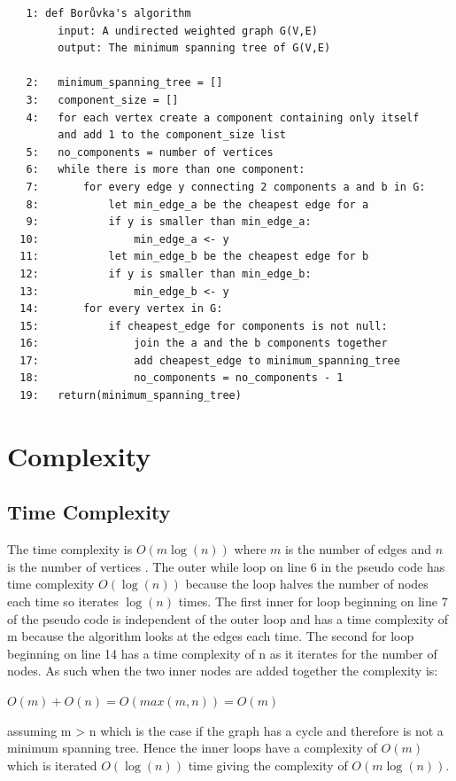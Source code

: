 \documentclass[a4paper,11pt]{article}
\begin{document}
\begin{verbatim}
   1: def Borůvka's algorithm
        input: A undirected weighted graph G(V,E)
        output: The minimum spanning tree of G(V,E)
    
   2:   minimum_spanning_tree = []
   3:   component_size = []
   4:   for each vertex create a component containing only itself 
        and add 1 to the component_size list
   5:   no_components = number of vertices
   6:   while there is more than one component:
   7:       for every edge y connecting 2 components a and b in G:
   8:           let min_edge_a be the cheapest edge for a 
   9:           if y is smaller than min_edge_a:
  10:               min_edge_a <- y
  11:           let min_edge_b be the cheapest edge for b
  12:           if y is smaller than min_edge_b:
  13:               min_edge_b <- y
  14:       for every vertex in G:
  15:           if cheapest_edge for components is not null:
  16:               join the a and the b components together
  17:               add cheapest_edge to minimum_spanning_tree
  18:               no_components = no_components - 1
  19:   return(minimum_spanning_tree)
\end{verbatim}

\section{Complexity}
\subsection{Time Complexity}
The time complexity is $O(m\log(n))$ where $m$ is the number of edges and $n$ is the number of vertices \cite{FBAZLAMACCI2001767}. The outer while loop on line 6 in the pseudo code has time complexity $O(\log(n))$ because the loop halves the number of nodes each time so iterates $\log(n)$ times. The first inner for loop beginning on line 7 of the pseudo code is independent of the outer loop and has a time complexity of m because the algorithm looks at the edges each time. The second for loop beginning on line 14 has a time complexity of n as it iterates for the number of nodes. As such when the two inner nodes are added together the complexity is:

$O(m) + O(n) = O(max(m,n)) = O(m)$

assuming m > n which is the case if the graph has a cycle and therefore is not a minimum spanning tree. Hence the inner loops have a complexity of $O(m)$ which is iterated $O(\log(n))$ time giving the complexity of $O(m\log(n))$.
\end{document}
